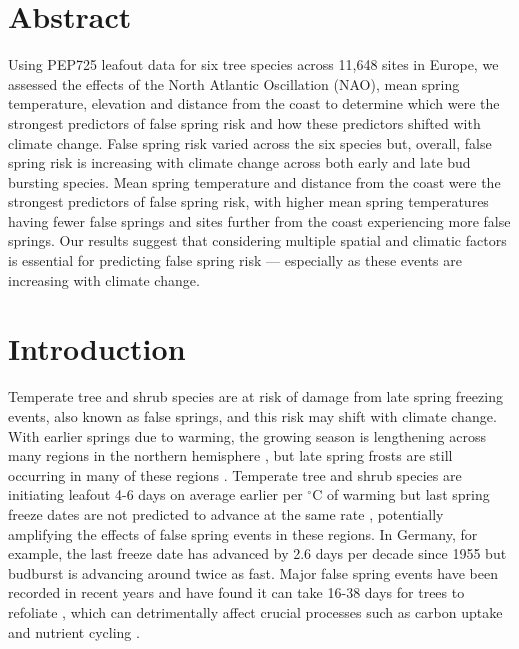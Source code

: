 \documentclass{article}\usepackage[]{graphicx}\usepackage[]{color}
\begin{document}
\section*{Abstract}
Using PEP725 leafout data for six tree species across 11,648 sites in Europe, we assessed the effects of the North Atlantic Oscillation (NAO), mean spring temperature, elevation and distance from the coast to determine which were the strongest predictors of false spring risk and how these predictors shifted with climate change. False spring risk varied across the six species but, overall, false spring risk is increasing with climate change across both early and late bud bursting species. Mean spring temperature and distance from the coast were the strongest predictors of false spring risk, with higher mean spring temperatures having fewer false springs and sites further from the coast experiencing more false springs. Our results suggest that considering multiple spatial and climatic factors is essential for predicting false spring risk --- especially as these events are increasing with climate change.

\section*{Introduction}
Temperate tree and shrub species are at risk of damage from late spring freezing events, also known as false springs, and this risk may shift with climate change. With earlier springs due to warming, the growing season is lengthening across many regions in the northern hemisphere \citep{Chen2005, Kukal2018, Liu2006}, but late spring frosts are still occurring in many of these regions \citep{Wypych2016a}. Temperate tree and shrub species are initiating leafout 4-6 days on average earlier per $^{\circ}$C of warming \citep{IPCC2014, Wolkovich2012} but last spring freeze dates are not predicted to advance at the same rate \citep{Inouye2008, Labe2016, Martin2010, Sgubin2018}, potentially amplifying the effects of false spring events in these regions. In Germany, for example, the last freeze date has advanced by 2.6 days per decade since 1955 \citep{Zohner2016} but budburst is advancing around twice as fast. Major false spring events have been recorded in recent years and have found it can take 16-38 days for trees to refoliate \citep{Augspurger2009, Augspurger2013, Gu2008, Menzel2015}, which can detrimentally affect crucial processes such as carbon uptake and nutrient cycling \citep{Hufkens2012, Klosterman2018, Richardson2013}.
\end{document}
